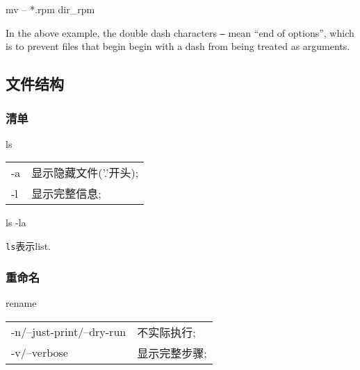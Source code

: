 \documentclass[hidelinks]{ctexart}
\begin{document}
\begin{shlst}
mv -- *.rpm dir_rpm
\end{shlst}
In the above example, the double dash characters \texttt{--} mean ``end of options'', which is to prevent files that begin begin with a dash from being treated as arguments.



\subsection{文件结构} %
\label{sub:文件结构}

\subsubsection{清单} %
\label{ssub:清单}

\begin{shcommand}{ls}
\ttfamily
\begin{tabular}{@{$\bullet\quad$}ll}
   -a      & 显示隐藏文件('.'开头); \\
   -l & 显示完整信息; \\
\end{tabular} 
\end{shcommand}
\begin{shlst}
ls -la
\end{shlst}

\texttt{ls}表示list.


\subsubsection{重命名} %
\label{ssub:重命名}

\begin{shcommand}{rename}
\ttfamily
\begin{tabular}{@{$\bullet\quad$}ll}
   -n/--just-print/--dry-run      & 不实际执行; \\
   -v/--verbose & 显示完整步骤; \\
\end{tabular} 
\end{shcommand}

\end{document}

